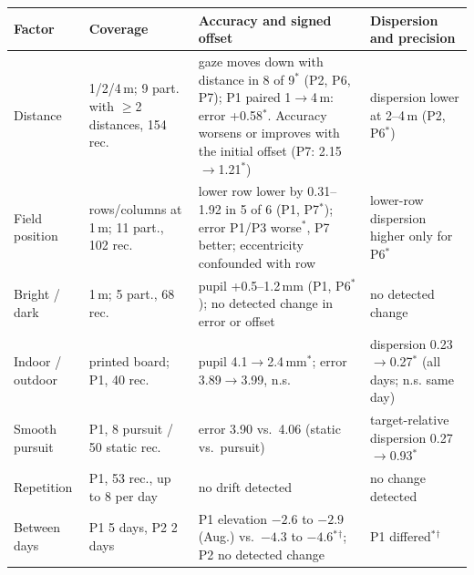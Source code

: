 \begin{tabular}{@{}p{}p{}p{}p{}@{}}
\toprule
Factor & Coverage & Accuracy and signed offset & Dispersion and precision \\
\midrule
\raggedright Distance & \raggedright 1/2/4\,m; 9 part. with $\geq$2 distances, 154 rec. & \raggedright gaze moves down with distance in 8 of 9$^*$ (P2, P6, P7); P1 paired 1$\to$4\,m: error +0.58\dg{}$^*$. Accuracy worsens or improves with the initial offset (P7: 2.15$\to$1.21\dg{}$^*$) & \raggedright dispersion lower at 2--4\,m (P2, P6$^*$) \tabularnewline
\raggedright Field position & \raggedright rows/columns at 1\,m; 11 part., 102 rec. & \raggedright lower row lower by 0.31--1.92\dg{} in 5 of 6 (P1, P7$^*$); error P1/P3 worse$^*$, P7 better; eccentricity confounded with row & \raggedright lower-row dispersion higher only for P6$^*$ \tabularnewline
\raggedright Bright / dark & \raggedright 1\,m; 5 part., 68 rec. & \raggedright pupil +0.5--1.2\,mm (P1, P6$^*$); no detected change in error or offset & \raggedright no detected change \tabularnewline
\raggedright Indoor / outdoor & \raggedright printed board; P1, 40 rec. & \raggedright pupil 4.1$\to$2.4\,mm$^*$; error 3.89$\to$3.99\dg{}, n.s. & \raggedright dispersion 0.23$\to$0.27\dg{}$^*$ (all days; n.s. same day) \tabularnewline
\raggedright Smooth pursuit & \raggedright P1, 8 pursuit / 50 static rec. & \raggedright error 3.90 vs.\ 4.06\dg{} (static vs.\ pursuit) & \raggedright target-relative dispersion 0.27$\to$0.93\dg{}$^*$ \tabularnewline
\raggedright Repetition & \raggedright P1, 53 rec., up to 8 per day & \raggedright no drift detected & \raggedright no change detected \tabularnewline
\raggedright Between days & \raggedright P1 5 days, P2 2 days & \raggedright P1 elevation $-2.6$ to $-2.9$\dg{} (Aug.) vs.\ $-4.3$ to $-4.6$\dg{}$^*$$^\dagger$; P2 no detected change & \raggedright P1 differed$^*$$^\dagger$ \tabularnewline
\bottomrule
\end{tabular}

